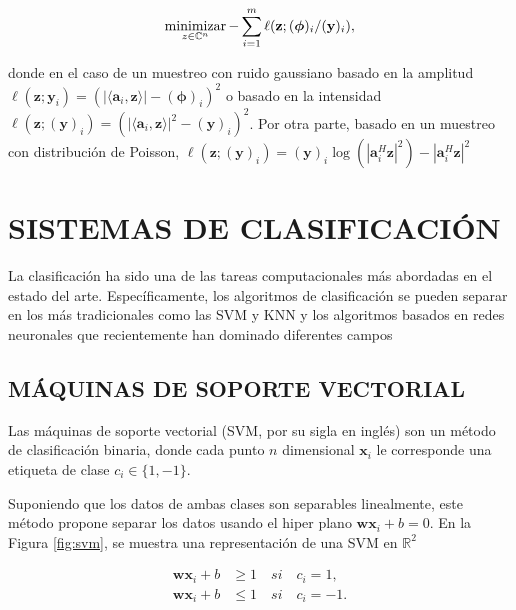 \begin{itemize}
    \begin{equation}
        \operatorname*{minimizar}_{z \in \mathbb{C}^{n}} -\sum_{i=1}^{m} \ell(\mathbf{z};(\boldsymbol{\phi})_i/(\mathbf{y})_i),
    \end{equation}
    
    donde en el caso de un muestreo con ruido gaussiano basado en la amplitud $\ell(\mathbf{z};\mathbf{y}_i) = (\vert \langle \mathbf{a}_i,\mathbf{z}\rangle \vert - (\boldsymbol{\phi})_i)^2$ o basado en la intensidad  $\ell(\mathbf{z};(\mathbf{y})_i) = (\vert \langle \mathbf{a}_i,\mathbf{z}\rangle \vert^2 - (\mathbf{y})_i)^2$. Por otra parte, basado en un muestreo con distribución de Poisson, $\ell(\mathbf{z};(\mathbf{y})_i) = {(\mathbf{y})_i \log(|\mathbf{a}_i^H \mathbf{z}|^2) -|\mathbf{a}_i^H \mathbf{z}|^2 }$ 
\end{itemize}





\chapter{SISTEMAS DE CLASIFICACIÓN}

La clasificación ha sido una de las tareas computacionales más abordadas en el estado del arte. Específicamente, los algoritmos de clasificación se pueden separar en los más tradicionales como las SVM y KNN  y los algoritmos basados en redes neuronales que recientemente han dominado diferentes campos 
\section{MÁQUINAS DE SOPORTE VECTORIAL}
Las máquinas de soporte vectorial (SVM, por su sigla en inglés)  son un método de clasificación binaria, donde cada punto $n$ dimensional $\mathbf{x}_i$ le corresponde una etiqueta de clase $c_i \in \{1,-1\}$.

Suponiendo que los datos de ambas clases son separables linealmente, este método propone separar los datos usando el hiper plano $\mathbf{w}\mathbf{x}_i + b = 0$. En la Figura \ref{fig:svm}, se muestra una representación de una SVM en $\mathbb{R}^2$

\begin{equation}
    \begin{split}
        \mathbf{w}\mathbf{x}_i + b &\geq 1 \quad si \quad c_i=1, \\
        \mathbf{w}\mathbf{x}_i + b &\leq 1 \quad si \quad c_i=-1.
    \end{split}
\end{equation}

